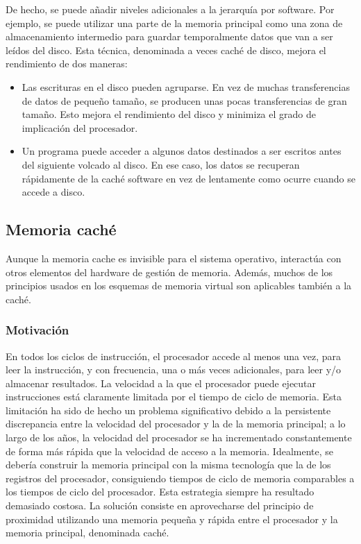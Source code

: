 \documentclass{article}
\begin{document}
		De hecho, se puede añadir niveles adicionales a la jerarquía por software. Por ejemplo, se puede utilizar una parte de la memoria principal como una zona de almacenamiento intermedio para guardar temporalmente datos que van a ser leídos del disco. Esta técnica, denominada a veces caché de disco, mejora el rendimiento de dos maneras:
		
		\begin{itemize}
		\item Las escrituras en el disco pueden agruparse. En vez de muchas transferencias de datos de pequeño tamaño, se producen unas pocas transferencias de gran tamaño. Esto mejora el rendimiento del disco y minimiza el grado de implicación del procesador.
		\item Un programa puede acceder a algunos datos destinados a ser escritos antes del siguiente volcado al disco. En ese caso, los datos se recuperan rápidamente de la caché software en vez de lentamente como ocurre cuando se accede a disco.
		\end{itemize}
		
	\subsection{Memoria caché}
		Aunque la memoria cache es invisible para el sistema operativo, interactúa con otros elementos del hardware de gestión de memoria. Además, muchos de los principios usados en los esquemas de memoria virtual son aplicables también a la caché. \\
		
		\subsubsection{Motivación}
			En todos los ciclos de instrucción, el procesador accede al menos una vez, para leer la instrucción, y con frecuencia, una o más veces adicionales, para leer y/o almacenar resultados. La velocidad a la que el procesador puede ejecutar instrucciones está claramente limitada por el tiempo de ciclo de memoria. Esta limitación ha sido de hecho un problema significativo debido a la persistente discrepancia entre la velocidad del procesador y la de la memoria principal; a lo largo de los años, la velocidad del procesador se ha incrementado constantemente de forma más rápida que la velocidad de acceso a la memoria. Idealmente, se debería construir la memoria principal con la misma tecnología que la de los registros del procesador, consiguiendo tiempos de ciclo de memoria comparables a los tiempos de ciclo del procesador. Esta estrategia siempre ha resultado demasiado costosa. La solución consiste en aprovecharse del principio de proximidad utilizando una memoria pequeña y rápida entre el procesador y la memoria principal, denominada caché. \\
			
\end{document}
